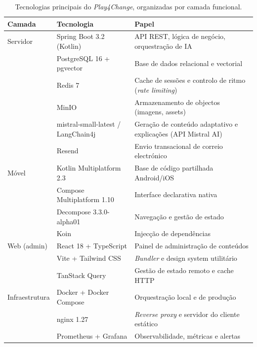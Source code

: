 \begin{table}[htbp]
	\centering
	\small
	\begin{tabular}{p{2.8cm} p{3.8cm} p{6.2cm}}
		\toprule
		\textbf{Camada} & \textbf{Tecnologia} & \textbf{Papel} \\
		\midrule
		Servidor        & Spring Boot 3.2 (Kotlin)    & API REST, lógica de negócio, orquestração de IA \\
		                & PostgreSQL 16 + pgvector    & Base de dados relacional e vectorial \\
		                & Redis 7                     & Cache de sessões e controlo de ritmo (\emph{rate limiting}) \\
		                & MinIO                       & Armazenamento de objectos (imagens, assets) \\
		                & mistral-small-latest / LangChain4j & Geração de conteúdo adaptativo e explicações (API Mistral AI) \\
		                & Resend                      & Envio transacional de correio electrónico \\
		\addlinespace
		Móvel           & Kotlin Multiplatform 2.3    & Base de código partilhada Android/iOS \\
		                & Compose Multiplatform 1.10  & Interface declarativa nativa \\
		                & Decompose 3.3.0-alpha01               & Navegação e gestão de estado \\
		                & Koin                        & Injecção de dependências \\
		\addlinespace
		Web (admin)     & React 18 + TypeScript       & Painel de administração de conteúdos \\
		                & Vite + Tailwind CSS         & \emph{Bundler} e design system utilitário \\
		                & TanStack Query              & Gestão de estado remoto e cache HTTP \\
		\addlinespace
		Infraestrutura  & Docker + Docker Compose     & Orquestração local e de produção \\
		                & nginx 1.27                  & \emph{Reverse proxy} e servidor do cliente estático \\
		                & Prometheus + Grafana        & Observabilidade, métricas e alertas \\
		\bottomrule
	\end{tabular}
	\caption[Tecnologias utilizadas no Play4Change por camada]{Tecnologias principais do \emph{Play4Change}, organizadas por camada funcional.}
	\label{tab:tecnologias}
\end{table}

